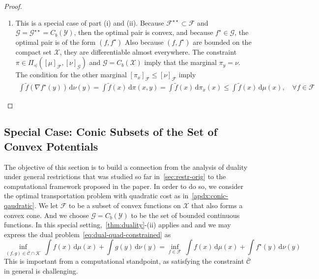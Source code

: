 \documentclass[10pt]{article}
\newcommand{\ud}{\,\mathrm{d}}
\renewcommand{\tilde}{\widetilde}
\newcommand{\calC}{\mathcal{C}}
\newcommand{\calF}{\mathcal{F}}
\newcommand{\calG}{\mathcal{G}}
\newcommand{\calK}{\mathcal{K}}
\newcommand{\calX}{\mathcal{X}}
\newcommand{\calY}{\mathcal{Y}}
\numberwithin{equation}{section}
\begin{document}
\begin{proof}
\begin{enumerate}
		\item This is a special case of part (i) and (ii). Because $\calF^{\star\star}\subset \calF$ and $\calG= \calG^{\star\star}=C_b(\calY)$, then the optimal pair is convex, and because $f^\star \in \calG$, the optimal pair is of the form $(f,f^\star)$ 
		Also because $(f,f^\star)$ are bounded on the compact set $\calX$, they are differentiable almost everywhere. 
		The constraint $\pi \in \Pi_{\preceq}([\mu]_\calF,[\nu]_\calG)$ and $\calG = C_b(\calX)$ imply that the marginal $\pi_y = \nu$. The condition for the other marginal $[\pi_x]_\calF \leq [\nu]_\calF$ imply
		\begin{align*}
		\int \tilde{f}(\nabla f^\star(y))\ud \nu(y)=\int \tilde{f}(x)\ud \pi(x,y)=\int \tilde{f}(x)\ud \pi_x(x) \leq \int \tilde{f}(x)\ud \mu(x),\quad \forall f \in \calF
		\end{align*}
	\end{enumerate}
\end{proof}


\subsection{Special Case: Conic Subsets of the Set of Convex Potentials}
The objective of this section is to build a connection from the analysis of duality under general restrictions that was studied so far in~\autoref{sec:restr-orig} to the computational framework proposed in the paper. In order to do so, we consider the optimal transportation problem with quadratic cost as in~\autoref{apdx:conic-qaudratic}. We let $\calF$ to be a subset of convex functions on $\calX$ that also forms a convex cone. And we choose $\calG = C_b(\calY)$ to be the set of bounded continuous functions. In this special setting,~\autoref{thm:duality}-(ii) applies and and we may express the dual problem~\eqref{eq:dual-quad-constrained} as
\begin{equation*}
\inf_{(f,g) \in \bar{\calC}\cap \calK}~ \int f(x)\ud \mu(x) + \int g(y)\ud \nu(y) = \inf_{f \in \calF}~ \int f(x)\ud \mu(x) + \int f^\star(y)\ud \nu(y)
\end{equation*}
This is important from a computational standpoint, as satisfying the constraint $\bar{\calC}$ in general is challenging. 
\end{document}
